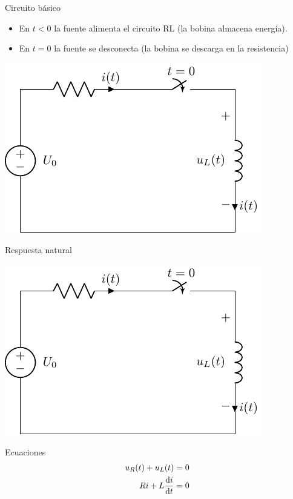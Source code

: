 \documentclass[aspectratio=169, usenames,svgnames,dvipsnames]{beamer}
\begin{document}
\begin{frame}[label={sec:org624a59d}]{Circuito básico}
\begin{itemize}
\item En \(t < 0\) la fuente alimenta el circuito RL (la bobina almacena energía).
\item En \(t = 0\) la fuente se desconecta (la bobina se descarga en la resistencia)
\end{itemize}
\begin{center}
\includegraphics[height=0.5\textheight]{../figs/transitorio_circuitoRL.pdf}
\end{center}
\end{frame}

\begin{frame}[label={sec:orga6f03ba}]{Respuesta natural}
\begin{center}
\includegraphics[height=0.5\textheight]{../figs/transitorio_circuitoRL.pdf}
\end{center}

\begin{block}{Ecuaciones}
\begin{align*}
  u_R(t) + u_L(t) &= 0\\
  R i + L\diff{i}{t} &= 0
\end{align*}
\end{block}
\end{frame}
\end{document}
